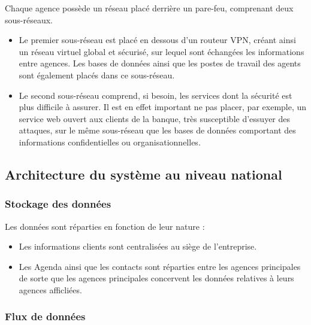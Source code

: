 \documentclass[a4paper]{article}
\begin{document}
Chaque agence possède un réseau placé derrière un pare-feu, comprenant deux sous-réseaux.
\begin{itemize}
  \item Le premier sous-réseau est placé en dessous d'un routeur VPN, créant ainsi un réseau virtuel global et sécurisé, sur lequel sont échangées les informations entre agences. Les bases de données ainsi que les postes de travail des agents sont également placés dans ce sous-réseau.
  \item Le second sous-réseau comprend, si besoin, les services dont la sécurité est plus difficile à assurer. Il est en effet important ne pas placer, par exemple, un service web ouvert aux clients de la banque, très susceptible d'essuyer des attaques, sur le même sous-réseau que les bases de données comportant des informations confidentielles ou organisationnelles. 
\end{itemize}


\subsection{Architecture du système au niveau national}
\subsubsection{ Stockage des données }

Les données sont réparties en fonction de leur nature :
\begin{itemize}
  \item Les informations clients sont centralisées au siège de l'entreprise.
  \item Les Agenda ainsi que les contacts sont réparties entre les agences principales de sorte que les agences principales concervent les données relatives à leurs agences afficliées.
\end{itemize}
  
\subsubsection{ Flux de données }
\end{document}
